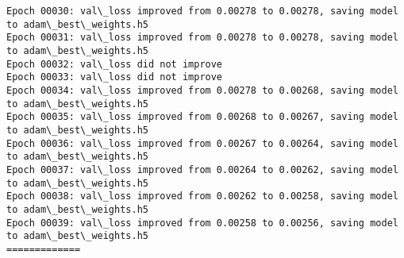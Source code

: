 \documentclass[11pt]{article}
\begin{document}
\begin{Verbatim}[commandchars=\\\{\}]
Epoch 00030: val\_loss improved from 0.00278 to 0.00278, saving model to adam\_best\_weights.h5
Epoch 00031: val\_loss improved from 0.00278 to 0.00278, saving model to adam\_best\_weights.h5
Epoch 00032: val\_loss did not improve
Epoch 00033: val\_loss did not improve
Epoch 00034: val\_loss improved from 0.00278 to 0.00268, saving model to adam\_best\_weights.h5
Epoch 00035: val\_loss improved from 0.00268 to 0.00267, saving model to adam\_best\_weights.h5
Epoch 00036: val\_loss improved from 0.00267 to 0.00264, saving model to adam\_best\_weights.h5
Epoch 00037: val\_loss improved from 0.00264 to 0.00262, saving model to adam\_best\_weights.h5
Epoch 00038: val\_loss improved from 0.00262 to 0.00258, saving model to adam\_best\_weights.h5
Epoch 00039: val\_loss improved from 0.00258 to 0.00256, saving model to adam\_best\_weights.h5
=============


\end{Verbatim}
\end{document}
